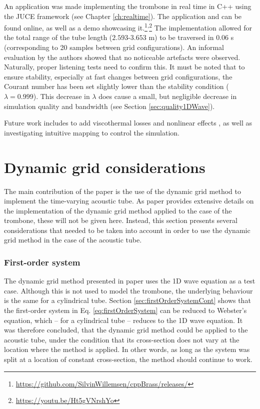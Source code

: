 An application was made implementing the trombone in real time in C++ using the JUCE framework (see Chapter \ref{ch:realtime}). The application and can be found online, as well as a demo showcasing it.\footnote{\url{https://github.com/SilvinWillemsen/cppBrass/releases/}}\textsuperscript{,}\footnote{\url{https://youtu.be/Ht5gVNrshYo}} The implementation allowed for the total range of the tube length ($2.593$-$3.653$ m) to be traversed in $0.06$ s (corresponding to 20 samples between grid configurations). An informal evaluation by the authors showed that no noticeable artefacts were observed. Naturally, proper listening tests need to confirm this. It must be noted that to ensure stability, especially at fast changes between grid configurations, the Courant number has been set slightly lower than the stability condition ($\lambda = 0.999$). This decrease in $\lambda$ does cause a small, but negligible decrease in simulation quality and bandwidth (see Section \ref{sec:quality1DWave}). 

Future work includes to add viscothermal losses \cite{Bilbao2016} and nonlinear effects \cite{msallam1997physical}, as well as investigating intuitive mapping to control the simulation.


\section{Dynamic grid considerations}
The main contribution of the paper is the use of the dynamic grid method to implement the time-varying acoustic tube. As paper \citeP[H] provides extensive details on the implementation of the dynamic grid method applied to the case of the trombone, these will not be given here. Instead, this section presents several considerations that needed to be taken into account in order to use the dynamic grid method in the case of the acoustic tube. 

\subsubsection{First-order system}
The dynamic grid method presented in paper \citeP[G] uses the 1D wave equation as a test case. Although this is not used to model the trombone, the underlying behaviour is the same for a cylindrical tube. Section \ref{sec:firstOrderSystemCont} shows that the first-order system in Eq. \eqref{eq:firstOrderSystem} can be reduced to Webster's equation, which -- for a cylindrical tube -- reduces to the 1D wave equation. It was therefore concluded, that the dynamic grid method could be applied to the acoustic tube, under the condition that its cross-section does not vary at the location where the method is applied. In other words, as long as the system was split at a location of constant cross-section, %
the method should continue to work. 

